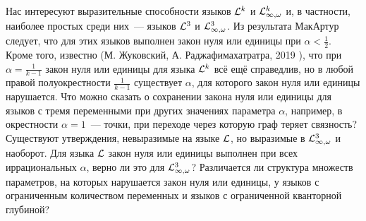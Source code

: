 Нас интересуют выразительные способности языков $\mathcal{L}^k$ и $\mathcal{L}^k_{\infty, \omega}$ и, в частности, наиболее простых среди них~--- языков  $\mathcal{L}^3$ и $\mathcal{L}^3_{\infty, \omega}$.
Из результата МакАртур \cite{mcarthur1997asymptotic} следует, что для этих языков выполнен закон нуля или единицы при $\alpha < \frac{1}{2}$.
Кроме того, известно (М. Жуковский, А. Раджафимахатратра, 2019 \cite{razafimahatratra2019zero}), что при $\alpha = \frac{1}{k-1}$ закон нуля или единицы для языка $\mathcal{L}^k$ всё ещё справедлив, но в любой правой полуокрестности $\frac{1}{k-1}$ существует $\alpha$, для которого закон нуля или единицы нарушается.
Что можно сказать о сохранении закона нуля или единицы для языков с тремя переменными при других значениях параметра $\alpha$, например, в окрестности $\alpha=1$~--- точки, при переходе через которую граф теряет связность?
Существуют утверждения, невыразимые на языке $\mathcal{L}$, но выразимые в $\mathcal{L}^3_{\infty, \omega}$ и наоборот.
Для языка $\mathcal{L}$ закон нуля или единицы выполнен при всех иррациональных $\alpha$, верно ли это для $\mathcal{L}^3_{\infty, \omega}$?
Различается ли структура множеств параметров, на которых нарушается закон нуля или единицы, у языков с ограниченным количеством переменных и языков с ограниченной кванторной глубиной? 